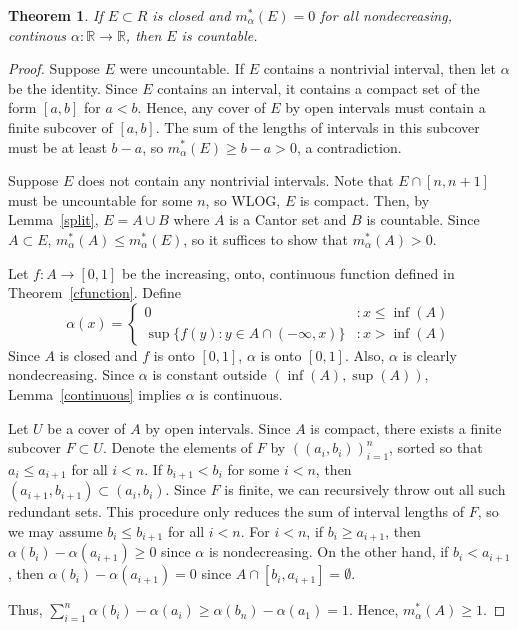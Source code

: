 \documentclass{article}
\newtheorem{theorem}{Theorem}
\newtheorem{corollary}{Corollary}
\newcommand{\R}{\mathbb{R}}
\newcommand{\m}{m^*_\alpha}
\begin{document}
\begin{theorem}
If $E \subset R$ is closed and $\m(E) = 0$ for all nondecreasing, continous $\alpha:\mathbb{R} \rightarrow \mathbb{R}$, then $E$ is countable.
\end{theorem}
\begin{proof}
Suppose $E$ were uncountable. If $E$ contains a nontrivial interval, then let $\alpha$ be the identity. Since $E$ contains an interval, it contains a compact set of the form $[a,b]$ for $a<b$. Hence, any cover of $E$ by open intervals must contain a finite subcover of $[a,b]$. The sum of the lengths of intervals in this subcover must be at least $b-a$, so $\m(E) \geq b - a > 0$, a contradiction.

Suppose $E$ does not contain any nontrivial intervals. Note that $E \cap [n,n+1]$ must be uncountable for some $n$, so WLOG, $E$ is compact. Then, by Lemma~\ref{split}, $E = A \cup B$ where $A$ is a Cantor set and $B$ is countable. Since $A \subset E$, $\m(A) \leq \m(E)$, so it suffices to show that $\m(A) > 0$.

Let $f:A \rightarrow [0,1]$ be the increasing, onto, continuous function defined in Theorem~\ref{cfunction}. Define
 \begin{displaymath}
   \alpha(x) = \left\{
     \begin{array}{lr}
       0 & : x \leq \inf(A)\\
       \sup\{f(y): y \in A \cap (-\infty, x)\} & : x > \inf(A)
     \end{array}
   \right.
\end{displaymath} 
Since $A$ is closed and $f$ is onto $[0,1]$, $\alpha$ is onto $[0,1]$. Also, $\alpha$ is clearly nondecreasing. Since $\alpha$ is constant outside $(\inf(A), \sup(A))$, Lemma~\ref{continuous} implies $\alpha$ is continuous.

Let $U$ be a cover of $A$ by open intervals. Since $A$ is compact, there exists a finite subcover $F \subset U$. Denote the elements of $F$ by  $((a_i, b_i))_{i=1}^n$, sorted so that $a_i \leq a_{i+1}$ for all $i<n$. If $b_{i+1} < b_i$ for some $i < n$, then $(a_{i+1}, b_{i+1}) \subset (a_i, b_i)$. Since $F$ is finite, we can recursively throw out all such redundant sets. This procedure only reduces the sum of interval lengths of $F$, so we may assume $b_i \leq b_{i+1}$ for all $i<n$. For $i < n$, if $b_i \geq a_{i+1}$, then $\alpha(b_i) - \alpha(a_{i+1}) \geq 0$ since $\alpha$ is nondecreasing. On the other hand, if $b_i < a_{i+1}$, then $\alpha(b_i) - \alpha(a_{i+1}) = 0$ since $A \cap [b_i, a_{i+1}] = \emptyset$. 

Thus, $\sum_{i=1}^n {\alpha(b_i) - \alpha(a_i)} \geq \alpha(b_n) - \alpha(a_1) = 1$. Hence, $\m(A) \geq 1$.
\end{proof}

\begin{comment}
\begin{corollary}
Let $f:\R\rightarrow\R$, and $D(f)$ denote the set of discontinuities of $f$. If $\m(D(f)) = 0$ for all nondecreasing, continous $\alpha:\mathbb{R} \rightarrow \mathbb{R}$, then $D(f)$ is countable.
\end{corollary}
\end{comment}
\end{document}
